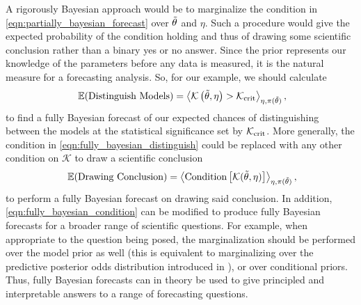\documentclass[twocolumn,english,aps,prd,amsmath,amssymb,reprint,floatfix,nofootinbib,showkeys]{revtex4-2}
\newcommand{\prior}{\pi}
\newcommand{\br}{\mathcal{K}}
\begin{document}
A rigorously Bayesian approach would be to marginalize the condition in \cref{eqn:partially_bayesian_forecast} over $\Tilde{\theta}$ and $\eta$. 
Such a procedure would give the expected probability of the condition holding and thus of drawing some scientific conclusion rather than a binary yes or no answer.
Since the prior represents our knowledge of the parameters before any data is measured, it is the natural measure for a forecasting analysis.
So, for our example, we should calculate
\begin{equation}~\label{eqn:fully_bayesian_distinguish}
    \mathbb{E}(\textrm{Distinguish Models}) = \left\langle \br\left(\Tilde{\theta}, \eta\right) > \br_{\rm crit} \right\rangle_{\eta, \prior(\Tilde{\theta})},
\end{equation}
to find a fully Bayesian forecast of our expected chances of distinguishing between the models at the statistical significance set by $\br_{\rm crit}$.
More generally, the condition in \cref{eqn:fully_bayesian_distinguish} could be replaced with any other condition on $\br$ to draw a scientific conclusion
\begin{equation}~\label{eqn:fully_bayesian_condition}
    \mathbb{E}(\textrm{Drawing Conclusion}) = \left\langle \textrm{Condition}\left[\br(\Tilde{\theta}, \eta)\right] \right\rangle_{\eta, \prior(\Tilde{\theta})},
\end{equation}
to perform a fully Bayesian forecast on drawing said conclusion. 
In addition, \cref{eqn:fully_bayesian_condition} can be modified to produce fully Bayesian forecasts for a broader range of scientific questions. 
For example, when appropriate to the question being posed, the marginalization should be performed over the model prior as well (this is equivalent to marginalizing over the predictive posterior odds distribution introduced in \citet{Trotta_2007b}), or over conditional priors. 
Thus, fully Bayesian forecasts can in theory be used to give principled and interpretable answers to a range of forecasting questions.
\end{document}
